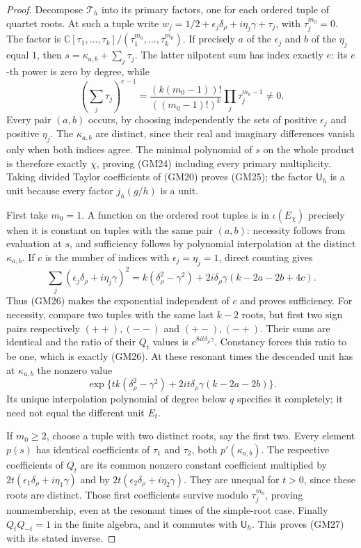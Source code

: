 \begin{proof}
Decompose $\mathcal T_h$ into its primary factors, one for each ordered
tuple of quartet roots.  At such a tuple write
$w_j=1/2+\epsilon_j\delta_\rho+i\eta_j\gamma+\tau_j$,
with $\tau_j^{m_0}=0$.  The factor is
$\mathbb C[\tau_1,\ldots,\tau_k]/(\tau_1^{m_0},\ldots,\tau_k^{m_0})$.
If precisely $a$ of the $\epsilon_j$ and $b$ of the $\eta_j$ equal
$1$, then $s=\kappa_{a,b}+\sum_j\tau_j$.  The latter nilpotent sum
has index exactly $e$: its $e$-th power is zero by degree, while
\[
 (\textstyle\sum_j\tau_j)^{e-1}
 =\frac{(k(m_0-1))!}{((m_0-1)!)^k}\prod_j\tau_j^{m_0-1}\ne0.
\]
Every pair $(a,b)$ occurs, by choosing independently the sets of
positive $\epsilon_j$ and positive $\eta_j$.  The $\kappa_{a,b}$
are distinct, since their real and imaginary differences vanish only
when both indices agree.  The minimal polynomial of $s$ on the
whole product is therefore exactly $\chi$, proving (GM24) including
every primary multiplicity.  Taking divided Taylor coefficients
of (GM20) proves (GM25); the factor $\mathsf U_h$ is a unit because
every factor $j_h(g/h)$ is a unit.

First take $m_0=1$.  A function on the ordered root tuples is in
$\iota(E_\chi)$ precisely when it is constant on tuples with the
same pair $(a,b)$: necessity follows from evaluation at $s$, and
sufficiency follows by polynomial interpolation at the distinct
$\kappa_{a,b}$.  If $c$ is the number of indices with
$\epsilon_j=\eta_j=1$, direct counting gives
\[
 \sum_j(\epsilon_j\delta_\rho+i\eta_j\gamma)^2
 =k(\delta_\rho^2-\gamma^2)
        +2i\delta_\rho\gamma(k-2a-2b+4c).
\]
Thus (GM26) makes the exponential independent of $c$ and proves
sufficiency.  For necessity, compare two tuples with the same last
$k-2$ roots, but first two sign pairs respectively $(++),(--)$
and $(+-),(-+)$.  Their sums are identical and the ratio of their
$Q_t$ values is $e^{8it\delta_\rho\gamma}$.  Constancy forces this
ratio to be one, which is exactly (GM26).  At these resonant times
the descended unit has at $\kappa_{a,b}$ the nonzero value
\[
 \exp\{tk(\delta_\rho^2-\gamma^2)
              +2it\delta_\rho\gamma(k-2a-2b)\}.
\]
Its unique interpolation polynomial of degree below $q$ specifies it
completely; it need not equal the different unit $E_t$.

If $m_0\geq2$, choose a tuple with two distinct roots, say the first
two.  Every element $p(s)$ has identical coefficients of $\tau_1$
and $\tau_2$, both $p'(\kappa_{a,b})$.  The respective coefficients
of $Q_t$ are its common nonzero constant coefficient multiplied by
$2t(\epsilon_1\delta_\rho+i\eta_1\gamma)$ and by
$2t(\epsilon_2\delta_\rho+i\eta_2\gamma)$.  They are unequal for
$t>0$, since these roots are distinct.  Those first coefficients
survive modulo $\tau_j^{m_0}$, proving nonmembership, even at the
resonant times of the simple-root case.  Finally $Q_tQ_{-t}=1$
in the finite algebra, and it commutes with $\mathsf U_h$.
This proves (GM27) with its stated inverse.
\end{proof}

